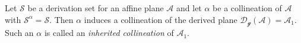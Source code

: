Let $\mathcal{S}$ be a derivation set for an affine plane $\mathcal{A}$ and let $\alpha$ be a collineation of $\mathcal{A}$ with $\mathcal{S}^{\alpha} = \mathcal{S}$. Then $\alpha$ induces a collineation of the derived plane $\mathcal{D}_{\mathcal{g}}(\mathcal{A}) = \mathcal{A}_1$. Such an $\alpha$ is called an \textit{inherited collineation} of $\mathcal{A}_1$.
